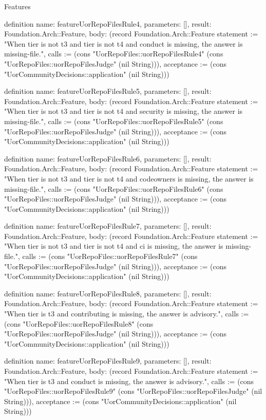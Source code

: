 \begin{lexlean}{Features}
\begin{semanticmodule}
definition{
  name: featureUorRepoFilesRule4,
  parameters: [],
  result: Foundation.Arch::Feature,
  body: (record Foundation.Arch::Feature {statement := "When tier is not t3 and tier is not t4 and conduct is missing, the answer is missing-file.", calls := (cons "UorRepoFiles::uorRepoFilesRule4" (cons "UorRepoFiles::uorRepoFilesJudge" (nil String))), acceptance := (cons "UorCommunityDecisions::application" (nil String))})
}

definition{
  name: featureUorRepoFilesRule5,
  parameters: [],
  result: Foundation.Arch::Feature,
  body: (record Foundation.Arch::Feature {statement := "When tier is not t3 and tier is not t4 and security is missing, the answer is missing-file.", calls := (cons "UorRepoFiles::uorRepoFilesRule5" (cons "UorRepoFiles::uorRepoFilesJudge" (nil String))), acceptance := (cons "UorCommunityDecisions::application" (nil String))})
}

definition{
  name: featureUorRepoFilesRule6,
  parameters: [],
  result: Foundation.Arch::Feature,
  body: (record Foundation.Arch::Feature {statement := "When tier is not t3 and tier is not t4 and codeowners is missing, the answer is missing-file.", calls := (cons "UorRepoFiles::uorRepoFilesRule6" (cons "UorRepoFiles::uorRepoFilesJudge" (nil String))), acceptance := (cons "UorCommunityDecisions::application" (nil String))})
}

definition{
  name: featureUorRepoFilesRule7,
  parameters: [],
  result: Foundation.Arch::Feature,
  body: (record Foundation.Arch::Feature {statement := "When tier is not t3 and tier is not t4 and ci is missing, the answer is missing-file.", calls := (cons "UorRepoFiles::uorRepoFilesRule7" (cons "UorRepoFiles::uorRepoFilesJudge" (nil String))), acceptance := (cons "UorCommunityDecisions::application" (nil String))})
}

definition{
  name: featureUorRepoFilesRule8,
  parameters: [],
  result: Foundation.Arch::Feature,
  body: (record Foundation.Arch::Feature {statement := "When tier is t3 and contributing is missing, the answer is advisory.", calls := (cons "UorRepoFiles::uorRepoFilesRule8" (cons "UorRepoFiles::uorRepoFilesJudge" (nil String))), acceptance := (cons "UorCommunityDecisions::application" (nil String))})
}

definition{
  name: featureUorRepoFilesRule9,
  parameters: [],
  result: Foundation.Arch::Feature,
  body: (record Foundation.Arch::Feature {statement := "When tier is t3 and conduct is missing, the answer is advisory.", calls := (cons "UorRepoFiles::uorRepoFilesRule9" (cons "UorRepoFiles::uorRepoFilesJudge" (nil String))), acceptance := (cons "UorCommunityDecisions::application" (nil String))})
}


\end{semanticmodule}
\end{lexlean}
